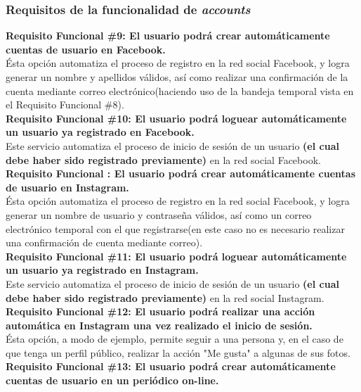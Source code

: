 \subsubsection{Requisitos de la funcionalidad de \textit{accounts}}
\begin{adjustwidth}{0.5cm}{}
	\textbf{Requisito Funcional \#9: El usuario podrá crear automáticamente cuentas de usuario en Facebook.}\\
	Ésta opción automatiza el proceso de registro en la red social Facebook, y logra generar un nombre y apellidos válidos, así como realizar una confirmación de la cuenta mediante correo electrónico(haciendo uso de la bandeja temporal vista en el Requisito Funcional \#8).\\
	\linebreak
	\textbf{Requisito Funcional \#10: El usuario podrá loguear automáticamente un usuario ya registrado en Facebook.}\\
	Este servicio automatiza el proceso de inicio de sesión de un usuario \textbf{(el cual debe haber sido registrado previamente)} en la red social Facebook. \\
	\linebreak
	\textbf{Requisito Funcional : El usuario podrá crear automáticamente cuentas de usuario en Instagram.}\\
	Ésta opción automatiza el proceso de registro en la red social Facebook, y logra generar un nombre de usuario y contraseña válidos, así como un correo electrónico temporal con el que registrarse(en este caso no es necesario realizar una confirmación de cuenta mediante correo).\\
	\linebreak
	\textbf{Requisito Funcional \#11: El usuario podrá loguear automáticamente un usuario ya registrado en Instagram.}\\
	Este servicio automatiza el proceso de inicio de sesión de un usuario \textbf{(el cual debe haber sido registrado previamente)} en la red social Instagram. \\
	\linebreak	
	\textbf{Requisito Funcional \#12: El usuario podrá realizar una acción automática en Instagram una vez realizado el inicio de sesión.}\\
	Ésta opción, a modo de ejemplo, permite seguir a una persona y, en el caso de que tenga un perfil público, realizar la acción "Me gusta" a algunas de sus fotos. \\
	\linebreak		
	\textbf{Requisito Funcional \#13: El usuario podrá crear automáticamente cuentas de usuario en un periódico on-line.}\\

\end{adjustwidth}
